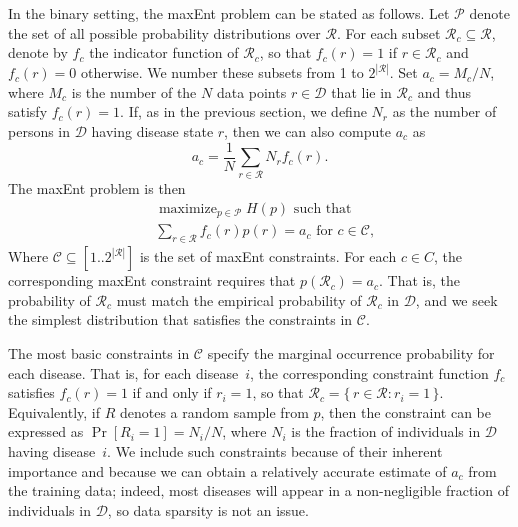 \documentclass[11pt]{article}
\DeclareMathOperator{\prb}{Pr}
\DeclareMathOperator*{\maximize}{maximize}
\newcommand{\prob}[1]{\prb[#1]}
\newcommand{\xC}{\mathcal{C}}
\newcommand{\xD}{\mathcal{D}}
\newcommand{\xP}{\mathcal{P}}
\newcommand{\xR}{\mathcal{R}}
\begin{document}
In the binary setting, the maxEnt problem can be stated as follows. Let $\xP$ denote the set of all possible probability distributions over $\xR$. For each subset $\xR_c\subseteq\xR$, denote by $f_c$ the indicator function of $\xR_c$, so that $f_c(r)=1$ if $r\in\xR_c$ and $f_c(r)=0$ otherwise. We number these subsets from 1 to $2^{|\xR|}$. Set $a_c=M_c/N$, where $M_c$ is the number of the $N$ data points $r\in\xD$ that lie in $\xR_c$ and thus satisfy $f_c(r)=1$. If, as in the previous section, we define $N_r$ as the number of persons in $\xD$ having disease state $r$, then we can also compute $a_c$ as
\begin{equation}\label{eq:defac}
a_c=\frac{1}{N}\sum_{r\in\xR}N_rf_c(r).
\end{equation}
The maxEnt problem is then
\begin{equation}\label{eq:maxent}
\begin{split}
&\maximize_{p\in\mathcal{P}}H(p)\text{ such that}\\
&\sum_{r\in\xR}f_c(r)p(r)=a_c\text{ for }c\in\xC,
\end{split}
\end{equation}
Where $\xC\subseteq [1..2^{|\xR|}]$ is the set of maxEnt constraints. For each $c\in C$, the corresponding maxEnt constraint requires that $p(\xR_c)=a_c$. That is, the probability of $\xR_c$ must match the empirical probability of $\xR_c$ in $\xD$, and we seek the simplest distribution that satisfies the constraints in $\xC$.

The most basic constraints in $\xC$ specify the marginal occurrence probability for each disease. That is, for each disease~$i$, the corresponding constraint function $f_c$ satisfies $f_c(r)=1$ if and only if $r_i=1$, so that $\xR_c=\{\,r\in\xR:r_i=1\,\}$. Equivalently, if $R$ denotes a random sample from $p$, then the constraint can be expressed as $\prob{R_i=1}=N_i/N$, where $N_i$ is the fraction of individuals in $\xD$ having disease~$i$. We include such constraints because of their
inherent importance and because we can obtain a relatively accurate estimate of $a_c$ from the training data; indeed, most diseases will appear in a non-negligible fraction of individuals in $\xD$, so data sparsity is not an issue.
\end{document}
